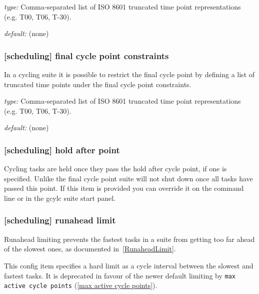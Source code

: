 \begin{myitemize}
    \item {\em type:} Comma-separated list of ISO 8601 truncated time point
        representations (e.g. T00, T06, T-30).
    \item {\em default:} (none)
\end{myitemize}

\subsubsection[final cycle point constraints]{[scheduling] \textrightarrow final cycle point constraints}
\label{final cycle point constraints}

In a cycling suite it is possible to restrict the final cycle point by
defining a list of truncated time points under the final cycle point
constraints.

\begin{myitemize}
    \item {\em type:} Comma-separated list of ISO 8601 truncated time point
        representations (e.g. T00, T06, T-30).
    \item {\em default:} (none)
\end{myitemize}

\subsubsection[hold after point]{[scheduling] \textrightarrow hold after point}

Cycling tasks are held once they pass the hold after cycle point, if one is
specified. Unlike the final cycle point suite will not shut down once all tasks
have passed this point. If this item is provided you can override it on the
command line or in the gcylc suite start panel.

\subsubsection[runahead limit]{[scheduling] \textrightarrow runahead limit}
\label{runahead limit}

Runahead limiting prevents the fastest tasks in a suite from getting too far
ahead of the slowest ones, as documented in~\ref{RunaheadLimit}.

This config item specifies a hard limit as a cycle interval between the
slowest and fastest tasks. It is deprecated in favour of the newer default
limiting by \lstinline=max active cycle points= (\ref{max active cycle points}).

